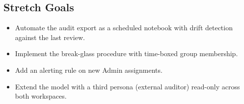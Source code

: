 \subsection*{Stretch Goals}
\begin{itemize}
    \item Automate the audit export as a scheduled notebook with drift detection against the last review.
    \item Implement the break-glass procedure with time-boxed group membership.
    \item Add an alerting rule on new Admin assignments.
    \item Extend the model with a third persona (external auditor) read-only across both workspaces.
\end{itemize}
